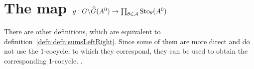 \begin{comment}
  \begin{cor}
    \marginnote{\cite[Cor.III.2.7]{Loday1994}}
    Write the twisted cocyle $\dot\phi\in\exp_{A^1}(\hat F^k)$ in terms of
    sums of $\hat F^k$ over $\cU^{\leq k}$:
    \[
      \dot \phi_\theta=S_\theta^-(\hat F^k)^{-1}S_\theta^+(\hat F^k)
      \text{, }
      \theta\in\A^{\leq k} \,.
    \]
    Then, the factors $\dot g^k=(\dot g^k_\theta)_{\theta\in\A^{\leq k}}$ and
    $\dot f^k=(\dot f^k_\theta)_{\theta\in\A^{\leq k}}$ in the induced
    decompositions satisfy
    \begin{align*}
      \dot g_\theta^k &=S_\theta^+(\hat F^{<k})^{-1}
                        S_\theta^-(\hat F^k)^{-1}
                        S_\theta^+(\hat F^k)
                        S_\theta^+(\hat F^{<k}) \,,
    \\\dot f_\theta^k &=S_\theta^-(\hat F^{<k})^{-1}
                        S_\theta^-(\hat F^k)^{-1}
                        S_\theta^+(\hat F^k)
                        S_\theta^+(\hat F^{<k}) \,.
    \end{align*}
  \end{cor}
\end{comment}

\section{The map
  $g:G\backslash\widehat G(A^0)\to\prod_{\theta\in\mathcal{A}}\operatorname{Sto}_\theta(A^0)$}
There are other definitions, which are equivalent to
definition~\ref{defn:defn:sumsLeftRight}. Since some of them are more direct
and do not use the $1$-cocycle, to which they correspond, they can be used to
obtain the corresponding $1$-cocycle.  \cite{Loday2014}.

